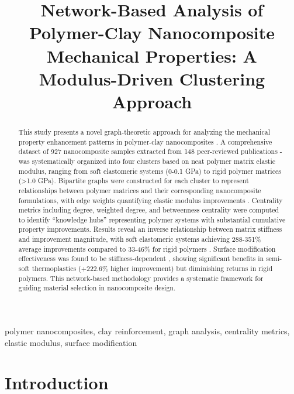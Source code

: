 \documentclass[conference]{IEEEtran}
\begin{document}
\title{Network-Based Analysis of Polymer-Clay Nanocomposite Mechanical Properties: A Modulus-Driven Clustering Approach}

\author{
}

\maketitle

\begin{abstract}
This study presents a novel graph-theoretic approach for analyzing the mechanical property enhancement patterns in polymer-clay nanocomposites \cite{112, 127}. A comprehensive dataset of 927 nanocomposite samples extracted from 148 peer-reviewed publications \cite{1}-\cite{148} was systematically organized into four clusters based on neat polymer matrix elastic modulus, ranging from soft elastomeric systems (0-0.1 GPa) to rigid polymer matrices (>1.0 GPa). Bipartite graphs were constructed for each cluster to represent relationships between polymer matrices and their corresponding nanocomposite formulations, with edge weights quantifying elastic modulus improvements \cite{10, 11}. Centrality metrics including degree, weighted degree, and betweenness centrality were computed to identify ``knowledge hubs'' representing polymer systems with substantial cumulative property improvements. Results reveal an inverse relationship between matrix stiffness and improvement magnitude, with soft elastomeric systems achieving 288-351\% average improvements compared to 33-46\% for rigid polymers \cite{14, 22}. Surface modification effectiveness was found to be stiffness-dependent \cite{138, 107}, showing significant benefits in semi-soft thermoplastics (+222.6\% higher improvement) but diminishing returns in rigid polymers. This network-based methodology provides a systematic framework for guiding material selection in nanocomposite design.
\end{abstract}

\begin{IEEEkeywords}
polymer nanocomposites, clay reinforcement, graph analysis, centrality metrics, elastic modulus, surface modification
\end{IEEEkeywords}

\section{Introduction}
\end{document}
